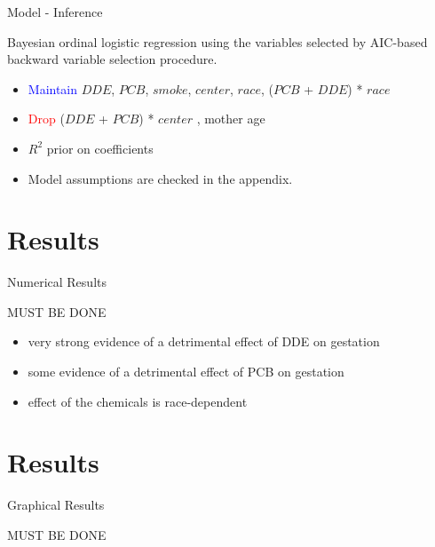 \documentclass{beamer}
\begin{document}
\begin{frame}{Model - Inference}

Bayesian ordinal logistic regression using the variables selected by AIC-based backward variable selection procedure.
\begin{itemize}
	\item \textcolor{blue}{Maintain} $DDE$, $PCB$, $smoke$, $center$, $race$, ($PCB$ + $DDE$) * $race$
	\item \textcolor{red}{Drop} ($DDE$ + $PCB$) * $center$ , mother age
	\item $R^2$ prior on coefficients
	\item Model assumptions are checked in the appendix.
\end{itemize}


\end{frame}




\section{Results}
\begin{frame}{Numerical Results}

MUST BE DONE

\begin{itemize}
	\item very strong evidence of a detrimental effect of DDE on gestation 
	\item some evidence of a detrimental effect of PCB on gestation
	\item effect of the chemicals is race-dependent
\end{itemize}
\end{frame}
\section{Results}

\begin{frame}{Graphical Results}

MUST BE DONE

\end{frame}

\end{document}
